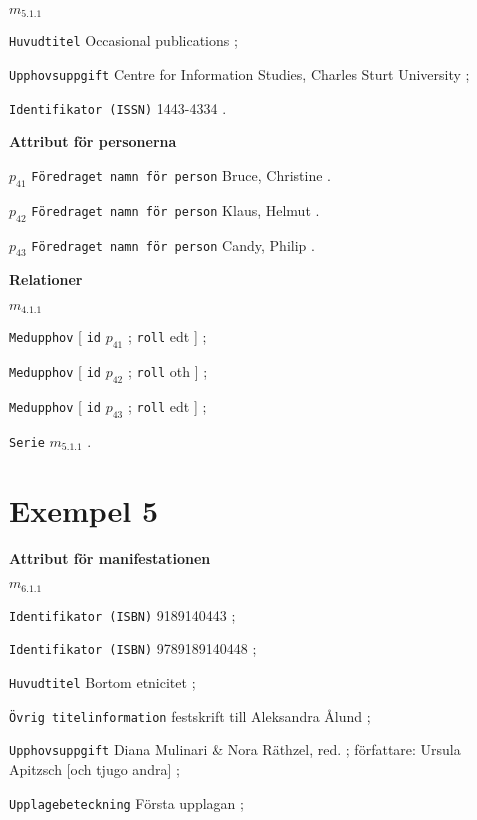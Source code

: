 \documentclass[a4,12pt]{article}
\begin{document}
\noindent $m_{5.1.1}$

  \texttt{Huvudtitel} Occasional publications ;

  \texttt{Upphovsuppgift} Centre for Information Studies,
Charles Sturt University ;

\texttt{Identifikator (ISSN)} 1443-4334 .




\vspace{3mm}

\textbf{Attribut för personerna}

\noindent $p_{41}$
  \texttt{Föredraget namn för person} Bruce, Christine .

\noindent $p_{42}$
  \texttt{Föredraget namn för person} Klaus, Helmut .

\noindent $p_{43}$
  \texttt{Föredraget namn för person} Candy, Philip .


\vspace{3mm}

\textbf{Relationer}

\noindent $m_{4.1.1}$

\texttt{Medupphov} [ \texttt{id}  $p_{41}$ ; \texttt{roll}  edt ] ;

\texttt{Medupphov} [ \texttt{id}  $p_{42}$ ; \texttt{roll}  oth ] ;

\texttt{Medupphov} [ \texttt{id}  $p_{43}$ ; \texttt{roll}  edt ] ;

\texttt{Serie}  $m_{5.1.1}$ .





\newpage

\section{Exempel 5}
\label{sec:ex5}


\textbf{Attribut för manifestationen}

\noindent $m_{6.1.1}$

 \texttt{Identifikator (ISBN)} 9189140443 ;

 \texttt{Identifikator (ISBN)} 9789189140448 ;

 \texttt{Huvudtitel} Bortom etnicitet ;
 
\texttt{Övrig titelinformation} festskrift till Aleksandra Ålund ;

\texttt{Upphovsuppgift} Diana
Mulinari \& Nora Räthzel, red. ; författare: Ursula Apitzsch [och tjugo andra] ;


\texttt{Upplagebeteckning} Första upplagan ;
\end{document}
